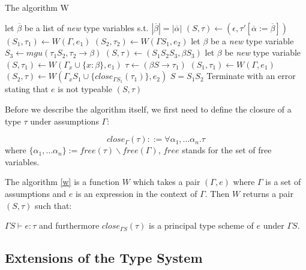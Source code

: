 \begin{algorithm}[t]
\caption{The algorithm W}
\label{w}
\begin{algorithmic}[1]
    \State let $\overline{\beta}$ be a list of \emph{new} type variables s.t. $|\overline{\beta}| = |\overline{\alpha}|$
    \State $(S, \tau) \gets (\epsilon, \tau' [\overline{\alpha} := \overline{\beta}])$
    \State $(S_1, \tau_1) \gets W(\Gamma, e_1)$
    \State $(S_2, \tau_2) \gets W(\Gamma S_1, e_2)$
    \State let $\beta$ be a \emph{new} type variable
    \State $S_3 \gets mgu (\tau_1 S_2, \tau_2 \rightarrow \beta)$
    \State $(S, \tau) \gets (S_1 S_2 S_3, \beta S_3)$
    \State let $\beta$ be \emph{new} type variable
    \State $(S, \tau_1) \gets W(\Gamma_x \cup \{x : \beta\}, e_1)$
    \State $\tau \gets (\beta S \rightarrow \tau_1)$
    \State $(S_1, \tau_1) \gets W(\Gamma, e_1)$
    \State $(S_2, \tau) \gets W(\Gamma_x S_1 \cup \{close_{\Gamma S_1}(\tau_1)\}, e_2)$
    \State $S = S_1 S_2$
    \Else
    \State Terminate with an error stating that $e$ is not typeable
    \EndIf
    \State \Return $(S, \tau)$
\EndFunction
\end{algorithmic}
\end{algorithm}

Before we describe the algorithm itself, we first need to define the closure of a type $\tau$ under assumptions $\Gamma$:

\begin{defn}
    \label{defn:close}
    $$close_\Gamma(\tau) ::= \forall \alpha_1, \dots \alpha_n . \tau$$
    where $\{\alpha_1, \dots \alpha_n\} := free(\tau) \backslash free(\Gamma)$, $free$ stands for the set of free variables. %
\end{defn}

The algorithm \ref{w} is a function $W$ which takes a pair $(\Gamma, e)$ where $\Gamma$ is a set of assumptions and $e$ is an expression in the context of $\Gamma$. Then $W$ returns a pair $(S, \tau)$ such that:

$\Gamma S \vdash e : \tau$ and furthermore $close_{\Gamma S}(\tau)$ is a principal type scheme of $e$ under $\Gamma S$.

\subsection{Extensions of the Type System}

